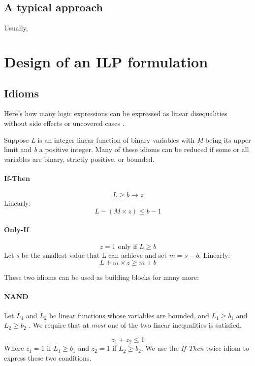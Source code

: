 \subsection{A typical approach}
Usually, 

\section{Design of an ILP formulation}

\subsection{Idioms}

Here's how many logic expressions can be expressed as linear disequalities without side effects or uncovered cases \cite{gusfieldilp}.

Suppose \textit{L} is an integer linear function of binary variables with \textit{M} being its upper limit and \textit{b} a positive integer. Many of these idioms can be reduced if some or all variables are binary, strictly positive, or bounded.

\paragraph{If-Then}

$$ L \geq b \rightarrow z$$
Linearly:
$$ L - (M \times z) \leq  b - 1$$


\paragraph{Only-If}

$$ \text{$z = 1$ only if $L \geq b$}$$
Let \textit{s} be the smallest value that L can achieve and set $m = s - b$. Linearly:
$$ L + m \times z \geq m + b$$

These two idioms can be used as building blocks for many more:

\paragraph{NAND \\} 

Let $L_1$ and $L_2$ be linear functions whose variables are bounded, and $L_1 \geq b_1$ and $L_2 \geq b_2$ . We require that
at \textit{most} one of the two linear inequalities is satisfied.

$$z_1 + z_2 \leq 1 $$
Where $z_1 = 1$ if $L_1 \geq b_1$ and $z_2 = 1$ if $L_2 \geq b_2$. We use the \textit{If-Then} twice idiom to express these two conditions.

